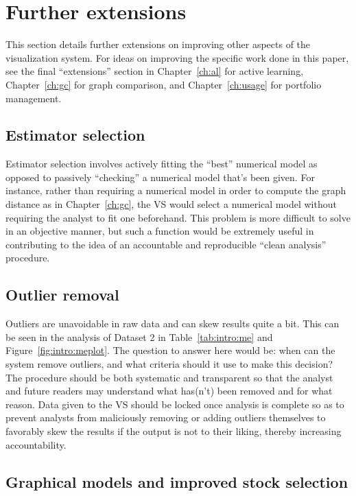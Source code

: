 \section{Further extensions}
\label{sec:futurework}

This section details further extensions on improving other aspects of the 
visualization system. For ideas on improving the specific work done in this 
paper, see the final ``extensions'' section in Chapter~\ref{ch:al} for active 
learning, Chapter~\ref{ch:gc} for graph comparison, and Chapter~\ref{ch:usage} 
for portfolio management.

\subsection{Estimator selection}
\label{sec:futurework:estimatorselection}

Estimator selection involves actively fitting the ``best'' numerical model as 
opposed to passively
``checking'' a numerical model that's been given. For instance, rather than 
requiring a numerical model in order to compute the graph distance as in 
Chapter~\ref{ch:gc}, the VS would select a numerical model without requiring 
the analyst to fit one beforehand. This problem is more difficult
to solve in an objective manner, but such a function would be extremely useful 
in contributing to the idea of an accountable and reproducible ``clean 
analysis'' procedure.

\subsection{Outlier removal}
\label{sec:futurework:outlier}

Outliers are unavoidable in raw data and can skew results quite a bit. This can 
be seen in the analysis of Dataset 2 in Table~\ref{tab:intro:me} and 
Figure~\ref{fig:intro:meplot}. The question to answer here would be: when can 
the system remove outliers, and what criteria should it use to make this 
decision? The procedure should be both systematic and transparent so that the 
analyst and future readers may understand what has(n't) been removed and for 
what reason. Data given to the VS should be locked once analysis is complete so 
as to prevent analysts from maliciously removing or adding outliers themselves 
to favorably skew the results if the output is not to their liking, thereby 
increasing accountability. 

\subsection{Graphical models and improved stock selection}
\label{sec:futurework:graphicalmodel}

